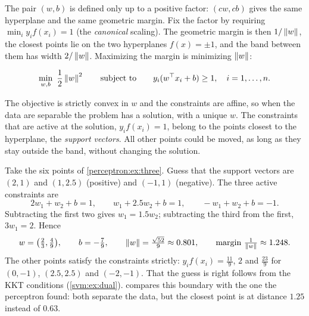 \begin{notechapter}
The pair $(w, b)$ is defined only up to a positive factor: $(cw, cb)$ gives the same
hyperplane and the same geometric margin. Fix the factor by requiring
$\min_iy_if(x_i) = 1$ (the \emph{canonical} scaling). The geometric margin is then $1/\left\|w\right\|$, the
closest points lie on the two hyperplanes $f(x) = \pm1$, and the band between them has
width $2/\left\|w\right\|$. Maximizing the margin is minimizing $\left\|w\right\|$:

\begin{definition}
\[
  \min_{w, b}\ \frac12\left\|w\right\|^2\qquad\text{subject to}\qquad y_i(w^\top x_i + b)\geq1,\quad i = 1,\dots,n .
\]
\end{definition}

The objective is strictly convex in $w$ and the constraints are affine, so when the data
are separable the problem has a solution, with a unique $w$. The constraints that are
active at the solution, $y_if(x_i) = 1$, belong to the points closest to the hyperplane, the
\emph{support vectors}. All other points could be moved, as long as they stay outside
the band, without changing the solution.

\begin{example}\label{svm:ex:hard}
Take the six points of \cref{perceptron:ex:three}. Guess that the support vectors are $(2, 1)$
and $(1, 2.5)$ (positive) and $(-1, 1)$ (negative). The three active constraints are
\[
  2w_1 + w_2 + b = 1,\qquad w_1 + 2.5w_2 + b = 1,\qquad -w_1 + w_2 + b = -1 .
\]
Subtracting the first two gives $w_1 = 1.5w_2$; subtracting the third from the first,
$3w_1 = 2$. Hence
\[
  w = \bigl(\tfrac23, \tfrac49\bigr),\qquad b = -\tfrac79,\qquad
  \left\|w\right\| = \tfrac{\sqrt{52}}9\approx0.801,\qquad\text{margin } \tfrac1{\left\|w\right\|}\approx1.248 .
\]
The other points satisfy the constraints strictly: $y_if(x_i) = \frac{11}9$, $2$ and $\frac{23}9$ for $(0, -1)$,
$(2.5, 2.5)$ and $(-2, -1)$. That the guess is right follows from the KKT conditions
(\cref{svm:ex:dual}).  compares this boundary with the one the perceptron
found: both separate the data, but the closest point is at distance $1.25$ instead of
$0.63$.
\end{example}


\end{notechapter}
